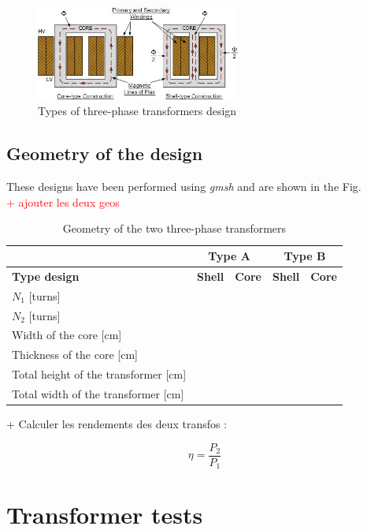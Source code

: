 \documentclass[12pt,a4paper]{report}
\begin{document}
 \begin{figure}[h]
    \centering
    \includegraphics[width=0.6\textwidth]{type_design_2.jpg}
    \caption{Types of three-phase transformers design}
    \label{fig:shell_core_type}
\end{figure}


\subsection{Geometry of the design}
These designs have been performed using \textit{gmsh} and are shown in the Fig.\\
\textcolor{red}{+ ajouter les deux geos}

\begin{table}[h]
    \centering
\begin{tabular}{|l|l|l|l|l|}
  \hline
   & \multicolumn{2}{c|}{\textbf{Type A}} & \multicolumn{2}{c|}{\textbf{Type B}}\\\hline
   \textbf{Type design} & \textbf{Shell} & \textbf{Core} & \textbf{Shell} & \textbf{Core}\\\hline
   $N_1$ [turns]& & & &\\\hline
    $N_2$ [turns]& & & &\\\hline
    Width of the core [cm]& & & &\\\hline
    Thickness of the core [cm]& & & &\\\hline
    Total height of the transformer [cm]& & & &\\\hline
    Total width of the transformer [cm]& & & &\\
  \hline
\end{tabular}
    \caption{Geometry of the two three-phase transformers}
    \label{tab:designed_transfo}
\end{table}

+ Calculer les rendements des deux transfos :

\begin{equation}
   \eta = \frac{P_2}{P_1}
\end{equation}

\section{Transformer tests}
\end{document}
